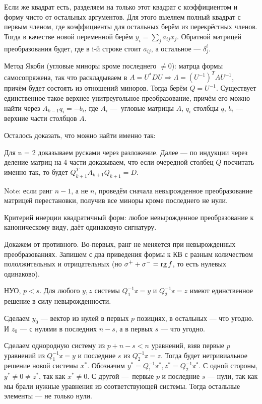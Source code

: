 \documentclass[12pt, a4paper]{article}
\begin{document}
Если же квадрат есть, разделяем на только этот квадрат с коэффициентом и форму чисто от остальных аргументов.
Для этого выеляем полный квадрат с первым членом, где коэффициенты для остальных берём из перекрёстных членов.
Тогда в качестве новой переменной берём $y_i = \sum_j a_{ij} x_j$. Обратной матрицей преобразования будет, где в i-й строке стоит $a_{ij}$, а остальное — $\delta^i_j$.

Метод Якоби (угловые миноры кроме последнего $\neq 0$): матрца формы самосопряжена, 
так что раскладываем в $A = U^*DU \Rightarrow \Lambda = (U^{-1})^T A U^{-1}$, причём будет состоять из отношений миноров.
Тогда берём $Q = U^{-1}$.
Существует единственное такое верхнее унитреугольное преобразование, причём его можно найти через $A_{k -1} q_i = -b_i$, где $A_i$ — угловые матрицы $A$, $q_i$ столбцы $q$, $b_i$ — верхние части столбцов $A$.

Осталось доказать, что можно найти именно так:

Для n = 2 доказываем русками через разложение. 
Далее — по индукции через деление матриц на 4 части доказываем, что если очередной столбец $Q$ посчитать именно так, то будет $Q_{k + 1}^T A_{k + 1} Q_{k + 1} = D$.

Note: если ранг $n - 1$, а не $n$, проведём сначала невырожденное преобразование матрицей перестановки, получив все миноры кроме последнего не нули.



Критерий инерции квадратичный форм: любое невырожденное преобразование к каноническому виду, даёт одинаковую сигнатуру.

Докажем от противного. Во-первых, ранг не меняется при невырожденных преобразованиях. 
Запишем с два приведения формы к КВ с разным количеством пололжительных и отрицательных (но $\sigma^+ + \sigma^- = \operatorname{rg} f$, то есть нулевых одинаково).

НУО, $p < s$. Для любого $y, z$ системы $Q_1^{-1} \mathbb{x} = y$ и $Q_2^{-1} \mathbb{x} = z$ имеют единственное решение в силу невырожденности.

Сделаем $y_0$ — вектор из нулей в первых $p$ позициях, в остальных — что угодно. И $z_0$ — с нулями в последних $n - s$, а в первых $s$ — что угодно.

Сделаем однородную систему из $p + n - s < n$ уравнений, взяв первые $p$ уравнений из $Q_1^{-1} \mathbb{x} = y$ 
и последние $s$ из $Q_2^{-1} \mathbb{x} = z$. Тогда будет нетривиальное решение новой системы $x^*$.
Обозначим $y^* = Q_1^{-1} \mathbb{x^*}, z^* = Q_2^{-1} \mathbb{x^*}$. С одной стороны, $y^* \neq 0 \neq z^*$, так как $x^* \neq 0$.
С другой — первые $p$ и последние $s$ — нули, так как мы брали нужные уравнения из соответствующей системы.
Тогда остальные элементы — не только нули.
\end{document}
